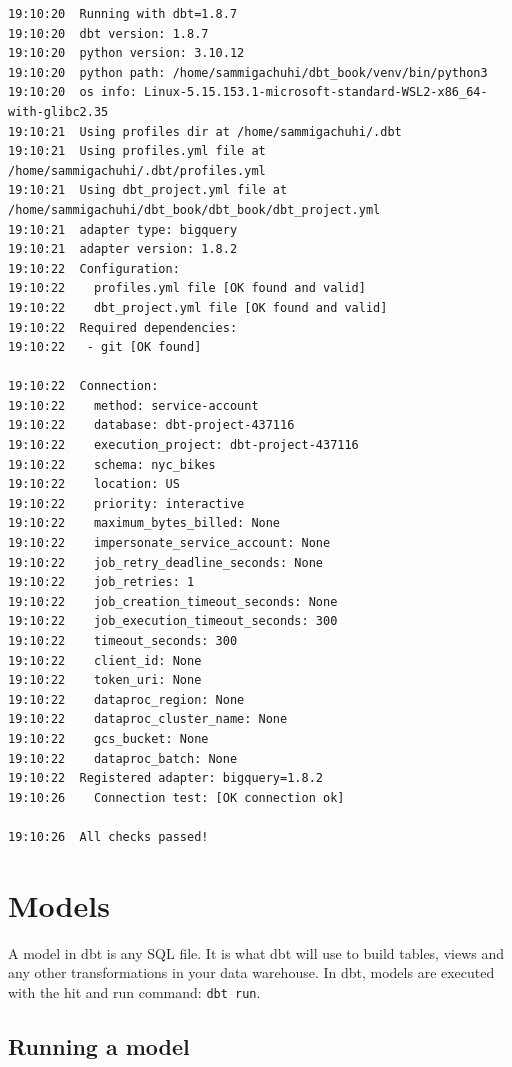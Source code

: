 \documentclass[
]{book}
\begin{document}
\begin{verbatim}
19:10:20  Running with dbt=1.8.7
19:10:20  dbt version: 1.8.7
19:10:20  python version: 3.10.12
19:10:20  python path: /home/sammigachuhi/dbt_book/venv/bin/python3
19:10:20  os info: Linux-5.15.153.1-microsoft-standard-WSL2-x86_64-with-glibc2.35
19:10:21  Using profiles dir at /home/sammigachuhi/.dbt
19:10:21  Using profiles.yml file at /home/sammigachuhi/.dbt/profiles.yml
19:10:21  Using dbt_project.yml file at /home/sammigachuhi/dbt_book/dbt_book/dbt_project.yml
19:10:21  adapter type: bigquery
19:10:21  adapter version: 1.8.2
19:10:22  Configuration:
19:10:22    profiles.yml file [OK found and valid]
19:10:22    dbt_project.yml file [OK found and valid]
19:10:22  Required dependencies:
19:10:22   - git [OK found]

19:10:22  Connection:
19:10:22    method: service-account
19:10:22    database: dbt-project-437116
19:10:22    execution_project: dbt-project-437116
19:10:22    schema: nyc_bikes
19:10:22    location: US
19:10:22    priority: interactive
19:10:22    maximum_bytes_billed: None
19:10:22    impersonate_service_account: None
19:10:22    job_retry_deadline_seconds: None
19:10:22    job_retries: 1
19:10:22    job_creation_timeout_seconds: None
19:10:22    job_execution_timeout_seconds: 300
19:10:22    timeout_seconds: 300
19:10:22    client_id: None
19:10:22    token_uri: None
19:10:22    dataproc_region: None
19:10:22    dataproc_cluster_name: None
19:10:22    gcs_bucket: None
19:10:22    dataproc_batch: None
19:10:22  Registered adapter: bigquery=1.8.2
19:10:26    Connection test: [OK connection ok]

19:10:26  All checks passed!

\end{verbatim}

\hypertarget{models-1}{%
\chapter{Models}\label{models-1}}

A model in dbt is any SQL file. It is what dbt will use to build tables, views and any other transformations in your data warehouse. In dbt, models are executed with the hit and run command: \texttt{dbt\ run}.

\hypertarget{running-a-model}{%
\section{Running a model}\label{running-a-model}}
\end{document}
